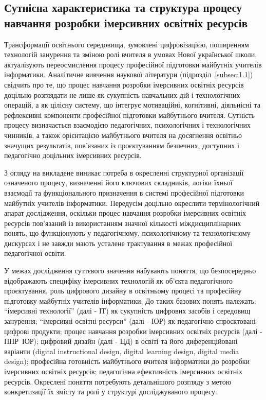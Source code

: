 \subsection{Сутнісна характеристика та структура процесу навчання розробки імерсивних освітніх ресурсів}\label{subsec:1.2}

Трансформації освітнього середовища, зумовлені цифровізацією, поширенням технологій занурення та зміною ролі вчителя в умовах Нової української школи, актуалізують переосмислення процесу професійної підготовки майбутніх учителів інформатики. Аналітичне вивчення наукової літератури (підрозділ~\ref{subsec:1.1}) свідчить про те, що процес навчання розробки імерсивних освітніх ресурсів доцільно розглядати не лише як сукупність навчальних дій і технологічних операцій, а як цілісну систему, що інтегрує мотиваційні, когнітивні, діяльнісні та рефлексивні компоненти професійної підготовки майбутнього вчителя. Сутність процесу визначається взаємодією педагогічних, психологічних і технологічних чинників, а також орієнтацією майбутнього вчителя на досягнення освітньо значущих результатів, пов'язаних із проєктуванням безпечних, доступних і педагогічно доцільних імерсивних ресурсів.

З огляду на викладене виникає потреба в окресленні структурної організації означеного процесу, визначенні його ключових складників, логіки їхньої взаємодії та функціонального призначення в системі професійної підготовки майбутніх учителів інформатики. Передусім доцільно окреслити термінологічний апарат дослідження, оскільки процес навчання розробки імерсивних освітніх ресурсів пов'язаний із використанням значної кількості міждисциплінарних понять, що функціонують у педагогічному, психологічному та технологічному дискурсах і не завжди мають усталене трактування в межах професійної педагогічної освіти.

У межах дослідження суттєвого значення набувають поняття, що безпосередньо відображають специфіку імерсивних технологій як об'єкта педагогічного проєктування, роль цифрового дизайну в освітньому процесі та професійну підготовку майбутніх учителів інформатики. До таких базових понять належать: ``імерсивні технології'' (далі - ІТ) як сукупність цифрових засобів і середовищ занурення; ``імерсивні освітні ресурси'' (далі - ІОР) як педагогічно спроєктовані цифрові продукти; процес навчання розробки імерсивних освітніх ресурсів (далі - ПНР~ІОР); цифровий дизайн (далі - ЦД) в освіті та його диференційовані варіанти (digital instructional design, digital learning design, digital media design); професійна готовність майбутнього вчителя інформатики до розробки імерсивних освітніх ресурсів; педагогічна ефективність імерсивних освітніх ресурсів. Окреслені поняття потребують детальнішого розгляду з метою конкретизації їх змісту та ролі у структурі досліджуваного процесу.

